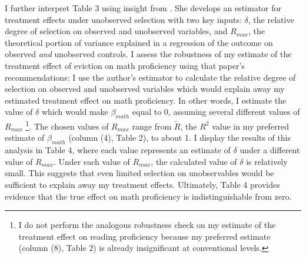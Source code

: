 \documentclass[12pt]{article}
\begin{document}
I further interpret Table 3 using insight from \cite{oster_unobservable_2019}. She develops an estimator for treatment effects under unobserved selection with two key inputs: $\delta$, the relative degree of selection on observed and unobserved variables, and $R_{max}$, the theoretical portion of variance explained in a regression of the outcome on observed \textit{and} unobserved controls. I assess the robustness of my estimate of the treatment effect of eviction on math proficiency using that paper's recommendations: I use the author's estimator to calculate the relative degree of selection on observed and unobserved variables which would explain away my estimated treatment effect on math proficiency. In other words, I estimate the value of $\delta$ which would make $\beta_{math}$ equal to 0, assuming several different values of $R_{max}$ \footnote{I do not perform the analogous robustness check on my estimate of the treatment effect on reading proficiency because my preferred estimate (column (8), Table 2) is already insignificant at conventional levels.}. The chosen values of $R_{max}$ range from $\tilde{R}$, the $R^2$ value in my preferred estimate of $\beta_{math}$ (column (4), Table 2), to about 1. I display the results of this analysis in Table 4, where each value represents an estimate of $\delta$ under a different value of $R_{max}$.  Under each value of $R_{max}$, the calculated value of $\delta$ is relatively small. This suggests that even limited selection on unobservables would be sufficient to explain away my treatment effects. Ultimately, Table 4 provides evidence that the true effect on math proficiency is indistinguishable from zero. 
\end{document}
